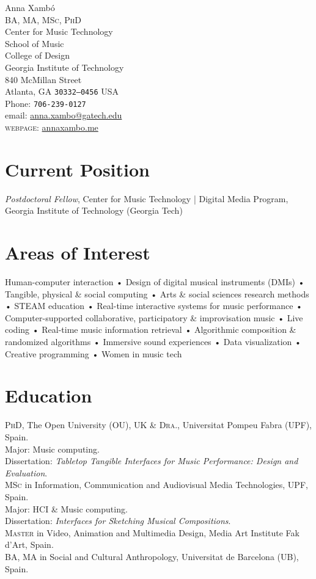 \documentclass[10pt, a4paper]{article}
\newcommand{\years}[1]{\marginnote{\scriptsize #1}}
\begin{document}
{\Huge Anna Xambó}\\[0.1cm]
\textsc{BA, MA, MSc, PhD}\\[1cm]
Center for Music Technology\\
School of Music\\
College of Design\\
Georgia Institute of Technology\\
840 McMillan Street\\
Atlanta, GA  \texttt{30332--0456}
USA\\[.2cm]
Phone: \texttt{706-239-0127}\\[.2cm]
email: \href{mailto:anna.xambo@gatech.edu}{anna.xambo@gatech.edu}\\
\textsc{webpage}: \href{http://annaxambo.me/}{annaxambo.me}\\ 

\section*{Current Position}
\emph{Postdoctoral Fellow}, Center for Music Technology | Digital Media Program, Georgia Institute of Technology (Georgia Tech)

\section*{Areas of Interest}
Human-computer interaction • Design of digital musical instruments (DMIs) • Tangible, physical \& social computing • Arts \& social sciences research methods • STEAM education • Real-time interactive systems for music performance • Computer-supported collaborative, participatory \& improvisation music • Live coding • Real-time music information retrieval • Algorithmic composition \& randomized algorithms • Immersive sound experiences • Data visualization • Creative programming • Women in music tech

\section*{Education}
\noindent
\years{2015}\textsc{PhD}, The Open University (OU), UK \& \textsc{Dra.}, Universitat Pompeu Fabra (UPF), Spain.\\
Major: Music computing.\\ 
Dissertation: \emph{Tabletop Tangible Interfaces for Music Performance: Design and Evaluation}.\\
\years{2008}\textsc{MSc} in Information, Communication and Audiovisual Media Technologies, UPF, Spain.\\
Major: HCI \& Music computing.\\ 
Dissertation: \emph{Interfaces for Sketching Musical Compositions}.\\
\years{1999}\textsc{Master} in Video, Animation and Multimedia Design, Media Art Institute Fak d'Art, Spain.\\
\years{1996}\textsc{BA, MA} in Social and Cultural Anthropology, Universitat de Barcelona (UB), Spain.
\end{document}
